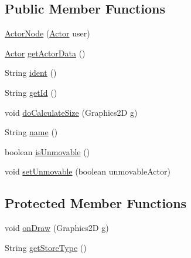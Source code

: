 \subsection*{Public Member Functions}
\begin{DoxyCompactItemize}
\item 
\hyperlink{classorg_1_1tzi_1_1use_1_1gui_1_1views_1_1diagrams_1_1behavior_1_1communicationdiagram_1_1_actor_node_a39219ca926c0fe324b4817675968f4b4}{Actor\-Node} (\hyperlink{classorg_1_1tzi_1_1use_1_1gui_1_1views_1_1diagrams_1_1behavior_1_1communicationdiagram_1_1_actor}{Actor} user)
\item 
\hyperlink{classorg_1_1tzi_1_1use_1_1gui_1_1views_1_1diagrams_1_1behavior_1_1communicationdiagram_1_1_actor}{Actor} \hyperlink{classorg_1_1tzi_1_1use_1_1gui_1_1views_1_1diagrams_1_1behavior_1_1communicationdiagram_1_1_actor_node_a163e6af7c89d5d3ee61def5ebfea3ad6}{get\-Actor\-Data} ()
\item 
String \hyperlink{classorg_1_1tzi_1_1use_1_1gui_1_1views_1_1diagrams_1_1behavior_1_1communicationdiagram_1_1_actor_node_a30ab88ca93046fe963f69a88e4841b83}{ident} ()
\item 
String \hyperlink{classorg_1_1tzi_1_1use_1_1gui_1_1views_1_1diagrams_1_1behavior_1_1communicationdiagram_1_1_actor_node_aeb893fa22680305350dc209de35f4f44}{get\-Id} ()
\item 
void \hyperlink{classorg_1_1tzi_1_1use_1_1gui_1_1views_1_1diagrams_1_1behavior_1_1communicationdiagram_1_1_actor_node_a2287e61647bba0347e47e89e400d328f}{do\-Calculate\-Size} (Graphics2\-D g)
\item 
String \hyperlink{classorg_1_1tzi_1_1use_1_1gui_1_1views_1_1diagrams_1_1behavior_1_1communicationdiagram_1_1_actor_node_a1171722427ea6a870630d85ba45f868d}{name} ()
\item 
boolean \hyperlink{classorg_1_1tzi_1_1use_1_1gui_1_1views_1_1diagrams_1_1behavior_1_1communicationdiagram_1_1_actor_node_aafca3d97bf053b032c3c051b30d1ee69}{is\-Unmovable} ()
\item 
void \hyperlink{classorg_1_1tzi_1_1use_1_1gui_1_1views_1_1diagrams_1_1behavior_1_1communicationdiagram_1_1_actor_node_afdb7c0bd5c0867050e51fb70ec5a348d}{set\-Unmovable} (boolean unmovable\-Actor)
\end{DoxyCompactItemize}
\subsection*{Protected Member Functions}
\begin{DoxyCompactItemize}
\item 
void \hyperlink{classorg_1_1tzi_1_1use_1_1gui_1_1views_1_1diagrams_1_1behavior_1_1communicationdiagram_1_1_actor_node_ab168b704f4b89aaf8de967520267f827}{on\-Draw} (Graphics2\-D g)
\item 
String \hyperlink{classorg_1_1tzi_1_1use_1_1gui_1_1views_1_1diagrams_1_1behavior_1_1communicationdiagram_1_1_actor_node_a94df29be4445f5a9070c6c582147ca2d}{get\-Store\-Type} ()
\end{DoxyCompactItemize}
